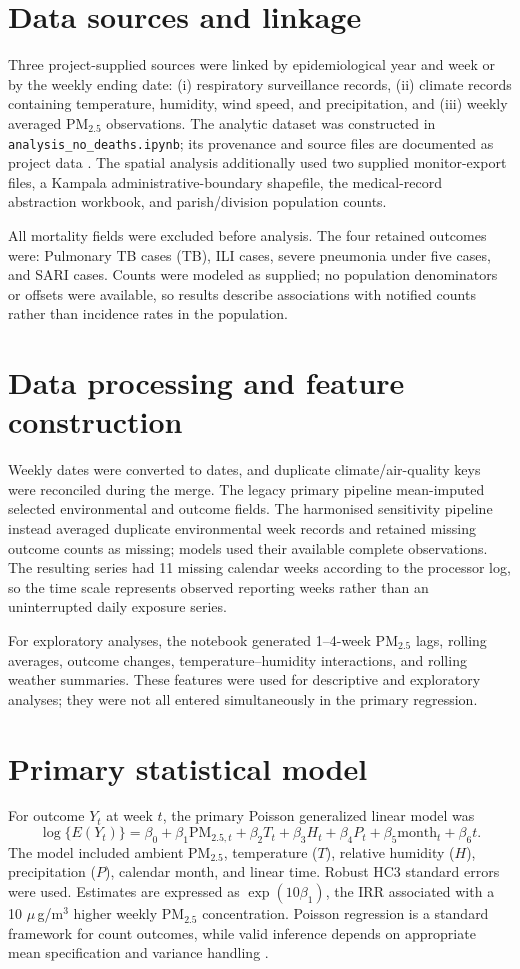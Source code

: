 \documentclass[12pt,a4paper]{report}
\newcommand{\pmfive}{PM$_{2.5}$}
\newcommand{\ugm}{\ensuremath{\mu}\,g/m$^3$}
\begin{document}
\section{Data sources and linkage}
Three project-supplied sources were linked by epidemiological year and week or by the weekly ending date: (i) respiratory surveillance records, (ii) climate records containing temperature, humidity, wind speed, and precipitation, and (iii) weekly averaged \pmfive{} observations. The analytic dataset was constructed in \texttt{analysis\_no\_deaths.ipynb}; its provenance and source files are documented as project data \parencite{ProjectData2026}. The spatial analysis additionally used two supplied monitor-export files, a Kampala administrative-boundary shapefile, the medical-record abstraction workbook, and parish/division population counts.

All mortality fields were excluded before analysis. The four retained outcomes were: Pulmonary TB cases (TB), ILI cases, severe pneumonia under five cases, and SARI cases. Counts were modeled as supplied; no population denominators or offsets were available, so results describe associations with notified counts rather than incidence rates in the population.

\section{Data processing and feature construction}
Weekly dates were converted to dates, and duplicate climate/air-quality keys were reconciled during the merge. The legacy primary pipeline mean-imputed selected environmental and outcome fields. The harmonised sensitivity pipeline instead averaged duplicate environmental week records and retained missing outcome counts as missing; models used their available complete observations. The resulting series had 11 missing calendar weeks according to the processor log, so the time scale represents observed reporting weeks rather than an uninterrupted daily exposure series.

For exploratory analyses, the notebook generated 1--4-week \pmfive{} lags, rolling averages, outcome changes, temperature--humidity interactions, and rolling weather summaries. These features were used for descriptive and exploratory analyses; they were not all entered simultaneously in the primary regression.

\section{Primary statistical model}
For outcome $Y_t$ at week $t$, the primary Poisson generalized linear model was
\[
\log\{E(Y_t)\}=\beta_0+\beta_1\mathrm{PM}_{2.5,t}+\beta_2T_t+\beta_3H_t+\beta_4P_t+\beta_5\mathrm{month}_t+\beta_6t.
\]
The model included ambient \pmfive{}, temperature ($T$), relative humidity ($H$), precipitation ($P$), calendar month, and linear time. Robust HC3 standard errors were used. Estimates are expressed as $\exp(10\beta_1)$, the IRR associated with a 10 \ugm{} higher weekly \pmfive{} concentration. Poisson regression is a standard framework for count outcomes, while valid inference depends on appropriate mean specification and variance handling \parencite{CameronTrivedi2013}.
\end{document}
